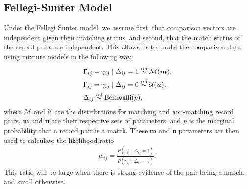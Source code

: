 \documentclass[ba]{imsart}
\begin{document}
%

\subsection{Fellegi-Sunter Model}
\label{fellegi-sunter}

Under the Fellegi Sunter model, we assume first, that comparison vectors are independent given their matching status, and second, that the match status of the record pairs are independent. This allows us to model the comparison data using mixture models in the following way:
\begin{align}
	&\Gamma_{ij} = \gamma_{ij} \mid \Delta_{ij} = 1 \stackrel{iid}{\sim} \mathcal{M}(\bm{m}), \\
	&\Gamma_{ij} = \gamma_{ij} \mid \Delta_{ij} = 0  \stackrel{iid}{\sim} \mathcal{U}(\bm{u}), \notag\\
	& \Delta_{ij}   \stackrel{iid}{\sim} \text{Bernoulli}(p), \notag
\end{align}
where $\mathcal{M}$ and $\mathcal{U}$ are the distributions for matching and non-matching record pairs, $\bm{m}$ and $\bm{u}$ are their respective sets of parameters, and $p$ is the marginal probability that a record pair is a match. These $\bm{m}$ and $\bm{u}$ parameters are then used to calculate the likelihood ratio  
\begin{align}
	\label{eqn:wts}
	w_{ij} = \frac{P(\gamma_{ij} \mid \Delta_{ij} = 1)}{P(\gamma_{ij} \mid \Delta_{ij} = 0)}.
\end{align}
This ratio will be large when there is strong evidence of the pair being a match, and small otherwise. 
\end{document}
